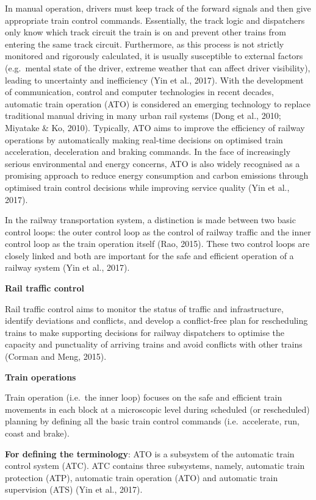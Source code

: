 \documentclass[
]{book}
\begin{document}
In manual operation, drivers must keep track of the forward signals and then give appropriate train control commands. Essentially, the track logic and dispatchers only know which track circuit the train is on and prevent other trains from entering the same track circuit. Furthermore, as this process is not strictly monitored and rigorously calculated, it is usually susceptible to external factors (e.g.~mental state of the driver, extreme weather that can affect driver visibility), leading to uncertainty and inefficiency (Yin et al., 2017). With the development of communication, control and computer technologies in recent decades, automatic train operation (ATO) is considered an emerging technology to replace traditional manual driving in many urban rail systems (Dong et al., 2010; Miyatake \& Ko, 2010). Typically, ATO aims to improve the efficiency of railway operations by automatically making real-time decisions on optimised train acceleration, deceleration and braking commands. In the face of increasingly serious environmental and energy concerns, ATO is also widely recognised as a promising approach to reduce energy consumption and carbon emissions through optimised train control decisions while improving service quality (Yin et al., 2017).

In the railway transportation system, a distinction is made between two basic control loops: the outer control loop as the control of railway traffic and the inner control loop as the train operation itself (Rao, 2015). These two control loops are closely linked and both are important for the safe and efficient operation of a railway system (Yin et al., 2017).

\textbf{Rail traffic control}

Rail traffic control aims to monitor the status of traffic and infrastructure, identify deviations and conflicts, and develop a conflict-free plan for rescheduling trains to make supporting decisions for railway dispatchers to optimise the capacity and punctuality of arriving trains and avoid conflicts with other trains (Corman and Meng, 2015).

\textbf{Train operations}

Train operation (i.e.~the inner loop) focuses on the safe and efficient train movements in each block at a microscopic level during scheduled (or rescheduled) planning by defining all the basic train control commands (i.e.~accelerate, run, coast and brake).

\textbf{For defining the terminology}: ATO is a subsystem of the automatic train control system (ATC). ATC contains three subsystems, namely, automatic train protection (ATP), automatic train operation (ATO) and automatic train supervision (ATS) (Yin et al., 2017).
\end{document}
